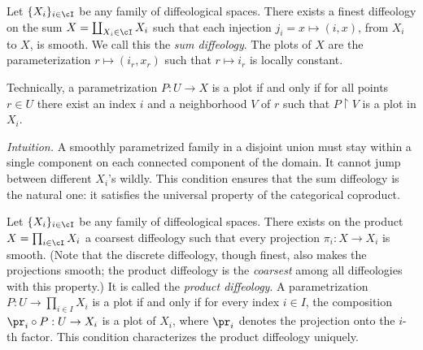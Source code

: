 \begin{article}
  \label{subsec:sums}
  Let $\{X_i\}_{i \in \cI}$ be any family of diffeological spaces.
  There exists a finest diffeology on the sum $X = \coprod_{X_i \in \cI} X_i$ such that each injection $j_i = x \mapsto (i,x)$,
  from $X_i$ to $X$,
  is smooth.
  We call this the \emph{sum diffeology}.
  The plots of $X$ are the parameterization $r \mapsto (i_r,x_r)$ such that $r \mapsto i_r$ is locally constant.
  
  Technically,
  a parametrization $P : U \to X$ is a plot if and only if for all points $r \in U$ there exist an index $i$ and a neighborhood $V$ of $r$ such that $P \restriction V$ is a plot in $X_i$.
  
  \noindent
  \textit{Intuition.} A smoothly parametrized family in a disjoint union
  must stay within a single component on each connected component of the domain.
  It cannot jump between different $X_i$'s wildly.
  This condition ensures that the sum diffeology is the natural one:
  it satisfies the universal property of the categorical coproduct.
\end{article}

\begin{article}
  \label{subsec:product}
  Let $\{X_i\}_{i \in \cI}$ be any family of diffeological spaces.
  There exists on the product $X = \prod_{i \in \cI} X_i$ a coarsest diffeology such that every projection $\pi_i \colon X \to X_i$ is smooth.
  (Note that the discrete diffeology,
  though finest,
  also makes the projections smooth;
  the product diffeology is the \emph{coarsest} among all diffeologies with this property.)
  It is called the \emph{product diffeology}.
  A parametrization $P: U \to \prod_{i\in I} X_i$ is a plot if and only if
  for every index $i\in I$, the composition
  $\pr_i \circ P : U \to X_i$ is a plot of $X_i$,
  where $\pr_i$ denotes the projection onto the $i$-th factor.
  This condition characterizes the product diffeology uniquely.
\end{article}

